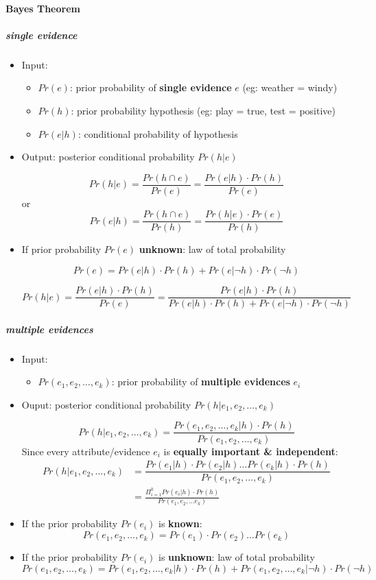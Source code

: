 \paragraph{Bayes Theorem} 
\subparagraph{single evidence}
\begin{itemize}
	\item Input: 
	\begin{itemize}
		\item $Pr(e)$: prior probability of \textbf{single evidence} $e$ (eg: weather = windy)
		\item $Pr(h)$: prior probability hypothesis (eg: play = true, test = positive)
		\item $Pr(e|h)$: conditional probability of hypothesis 
	\end{itemize} 
	\item Output: posterior conditional probability $Pr(h|e)$
	
	$$Pr(h|e) = \frac{Pr(h \cap e)}{Pr(e)} = \dfrac{Pr(e|h) \cdot Pr(h)}{Pr(e)}$$
or	
	$$Pr(e|h) = \frac{Pr(h \cap e)}{Pr(h)} = \dfrac{Pr(h|e) \cdot Pr(e)}{Pr(h)}$$
	\item If prior probability $Pr(e)$ \textbf{unknown}: law of total probability
	
	$$Pr(e) = Pr(e|h)\cdot Pr(h) + Pr(e|\neg h) \cdot Pr(\neg h)$$
	
	$$Pr(h|e) = \dfrac{Pr(e|h) \cdot Pr(h)}{Pr(e)} = \dfrac{Pr(e|h) \cdot Pr(h)}{Pr(e|h)\cdot Pr(h) + Pr(e|\neg h) \cdot Pr(\neg h)} $$
	
\end{itemize}
\subparagraph{multiple evidences}
\begin{itemize}
	\item Input: 
	\begin{itemize}
		\item $Pr(e_1, e_2, \dots, e_k)$: prior probability of \textbf{multiple evidences} $e_i$
	\end{itemize}
	\item Ouput: posterior conditional probability $Pr(h|e_1, e_2, \dots, e_k)$

	
	$$Pr(h|e_1, e_2, \dots, e_k) = \dfrac{Pr(e_1, e_2, \dots, e_k | h) \cdot Pr(h)}{Pr(e_1, e_2, \dots, e_k)}$$
	Since every attribute/evidence $e_i$ is \textbf{equally important \& independent}:
	\begin{align*}
		Pr(h|e_1, e_2, \dots, e_k) &= \dfrac{Pr(e_1 | h) \cdot Pr(e_2 | h) \dots Pr(e_k | h) \cdot Pr(h)}{Pr(e_1, e_2, \dots, e_k)} \\ 
		&= \frac{\Pi_{i=1}^k Pr(e_i|h) \cdot Pr(h)}{Pr(e_1,e_2, \dots e_k)}
	\end{align*}
	\item If the prior probability $Pr(e_i)$ is \textbf{known}: 
	$$Pr(e_1, e_2, \dots, e_k) = Pr(e_1)\cdot Pr(e_2)\dots Pr(e_k)$$
	\item If the prior probability $Pr(e_i)$ is \textbf{unknown}: law of total probability
	$$Pr(e_1, e_2, \dots, e_k) = Pr(e_1, e_2, \dots, e_k|h)\cdot Pr(h) + Pr(e_1, e_2, \dots, e_k | \neg h) \cdot Pr(\neg h)$$
\end{itemize}




